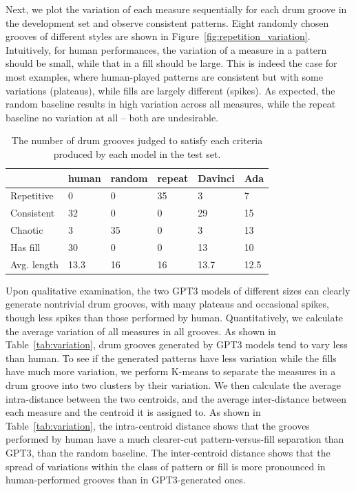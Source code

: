 \documentclass[letterpaper]{article} %
\begin{document}
Next, we plot the variation of each measure sequentially for each drum groove in the development set and observe consistent patterns. Eight randomly chosen grooves of different styles are shown in Figure~\ref{fig:repetition_variation}. Intuitively, for human performances, the variation of a measure in a pattern should be small, while that in a fill should be large. This is indeed the case for most examples, where human-played patterns are consistent but with some variations (plateaus), while fills are largely different (spikes). As expected, the random baseline results in high variation across all measures, while the repeat baseline no variation at all -- both are undesirable. 

\begin{table}[t!]
\small
\centering
\begin{tabular}{llllll}
\toprule
            & human & random & repeat & Davinci & Ada \\ \midrule
Repetitive   &  0  &  0 & 35  & 3  &  7   \\
Consistent   &  32  &  0 & 0  & 29  &  15   \\
Chaotic   &  3  &  35 & 0  & 3  &  13   \\
Has fill   &  30  &  0  & 0  &  13  &  10  \\
Avg. length   &  13.3  &   16  & 16  &  13.7  &  12.5  \\
\bottomrule
\end{tabular}
\caption{The number of drum grooves judged to satisfy each criteria produced by each model in the test set.}
\label{tab:subjective}
\end{table}

Upon qualitative examination, the two GPT3 models of different sizes can clearly generate nontrivial drum grooves, with many plateaus and occasional spikes, though less spikes than those performed by human. Quantitatively, we calculate the average variation of all measures in all grooves. As shown in Table~\ref{tab:variation}, drum grooves generated by GPT3 models tend to vary less than human. To see if the generated patterns have less variation while the fills have much more variation, we perform K-means to separate the measures in a drum groove into two clusters by their variation. We then calculate the average intra-distance between the two centroids, and the average inter-distance between each measure and the centroid it is assigned to. As shown in Table~\ref{tab:variation}, the intra-centroid distance shows that the grooves performed by human have a much clearer-cut pattern-versus-fill separation than GPT3, than the random baseline. The inter-centroid distance shows that the spread of variations within the class of pattern or fill is more pronounced in human-performed grooves than in GPT3-generated ones.
\end{document}
